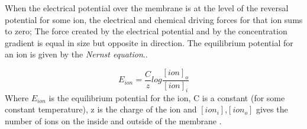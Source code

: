 



When the electrical potential over the membrane is at the level of the reversal potential for some ion, the electrical and chemical driving forces for that ion sums to zero;
The force created by the electrical potential and by the concentration gradient is equal in size but opposite in direction.
The equilibrium potential for an ion is given by the \emph{Nernst equation}\cite{NeuroscienceExploringTheBrain3edKAP3}..

\begin{equation}
	\label{eqNernstEquation}
 	E_{ion} = \frac{C}{z} log\frac{[ion]_o}{[ion]_i}
\end{equation}
Where $E_{ion}$ is the equilibrium potential for the ion, C is a constant (for some constant temperature), z is the charge of the ion and $[ion_i]$,$[ion_o]$ gives the number of ions on the inside and outside of the membrane
\cite{NeuroscienceExploringTheBrain3edKAP3}.

